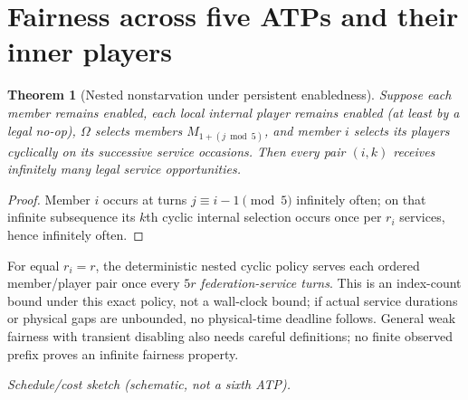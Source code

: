\documentclass[11pt]{article}
\newtheorem{theorem}{Theorem}[section]
\begin{document}
\section{Fairness across five ATPs and their inner players}
\begin{theorem}[Nested nonstarvation under persistent enabledness]
Suppose each member remains enabled, each local internal player remains enabled (at least by a legal no-op), $\Omega$ selects members $M_{1+(j\bmod5)}$, and member $i$ selects its players cyclically on its successive service occasions. Then every pair $(i,k)$ receives infinitely many legal service opportunities.
\end{theorem}
\begin{proof}Member $i$ occurs at turns $j\equiv i-1\pmod5$ infinitely often; on that infinite subsequence its $k$th cyclic internal selection occurs once per $r_i$ services, hence infinitely often.\end{proof}
For equal $r_i=r$, the deterministic nested cyclic policy serves each ordered member/player pair once every $5r$ \emph{federation-service turns}. This is an index-count bound under this exact policy, not a wall-clock bound; if actual service durations or physical gaps are unbounded, no physical-time deadline follows. General weak fairness with transient disabling also needs careful definitions; no finite observed prefix proves an infinite fairness property.
\begin{center}
\par\small\emph{Schedule/cost sketch (schematic, not a sixth ATP).}
\end{center}
\end{document}
